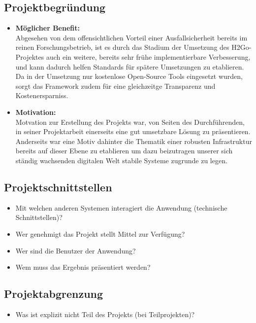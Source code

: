 \subsection{Projektbegründung}\label{sec:Projektbegruendung}
\begin{itemize}
	\item \textbf{Möglicher Benefit:}\\
	Abgesehen von dem offensichtlichen Vorteil einer Ausfallsicherheit bereits im reinen Forschungsbetrieb,
	ist es durch das Stadium der Umsetzung des H2Go-Projektes auch ein weitere, bereits sehr frühe implementierbare Verbesserung, und kann dadurch helfen Standards für spätere Umsetzungen zu 
	etablieren. Da in der Umsetzung nur kostenlose Open-Source Tools eingesetzt wurden, sorgt das Framework zudem für eine gleichzeitge Transparenz und Kostenersparniss.  
	\item \textbf{Motivation:}\\
	Motvation zur Erstellung des Projekts war, von Seiten des Durchführenden, in seiner Projektarbeit einerseits eine gut umsetzbare Lösung zu präsentieren. Anderseits war eine Motiv dahinter die Thematik einer 
	robusten Infrastruktur bereits auf dieser Ebene zu etablieren um dazu beizutragen unserer sich ständig wachsenden digitalen Welt stabile Systeme zugrunde zu legen. 
	    
\end{itemize}


\subsection{Projektschnittstellen} 
\label{sec:Projektschnittstellen}
\begin{itemize}
	\item Mit welchen anderen Systemen interagiert die Anwendung (technische Schnittstellen)?
	\item Wer genehmigt das Projekt \bzw stellt Mittel zur Verfügung? 
	\item Wer sind die Benutzer der Anwendung?
	\item Wem muss das Ergebnis präsentiert werden?
\end{itemize}


\subsection{Projektabgrenzung} 
\label{sec:Projektabgrenzung}
\begin{itemize}
	\item Was ist explizit nicht Teil des Projekts (\insb bei Teilprojekten)?
\end{itemize}

